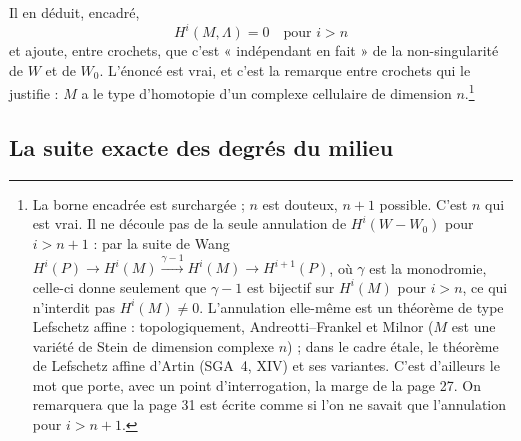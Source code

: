 \documentclass[11pt,a4paper]{article}
\begin{document}
Il en déduit, encadré,
\[
  \boxed{\ H^{i}(M, \Lambda) = 0 \quad \text{pour } i > n\ }
\]
et ajoute, entre crochets, que c'est « indépendant en fait » de la
non-singularité de $W$ et de $W_0$. L'énoncé est vrai, et c'est la remarque
entre crochets qui le justifie : $M$ a le type d'homotopie d'un complexe
cellulaire de dimension $n$.\footnote{La borne encadrée est surchargée ; $n$
est douteux, $n+1$ possible. C'est $n$ qui est vrai. Il ne découle pas de la
seule annulation de $H^{i}(W - W_0)$ pour $i > n+1$ : par la suite de Wang
$H^{i}(P) \to H^{i}(M) \xrightarrow{\gamma - 1} H^{i}(M) \to H^{i+1}(P)$, où
$\gamma$ est la monodromie, celle-ci donne seulement que $\gamma - 1$ est
bijectif sur $H^{i}(M)$ pour $i > n$, ce qui n'interdit pas $H^{i}(M) \neq 0$.
L'annulation elle-même est un théorème de type Lefschetz affine : topologiquement,
Andreotti--Frankel et Milnor ($M$ est une variété de Stein de dimension
complexe $n$) ; dans le cadre étale, le théorème de Lefschetz affine d'Artin
(SGA~4, XIV) et ses variantes. C'est d'ailleurs le mot que porte, avec un
point d'interrogation, la marge de la page 27. On remarquera que la page 31
est écrite comme si l'on ne savait que l'annulation pour $i > n+1$.}

\subsection*{La suite exacte des degrés du milieu}
\end{document}
